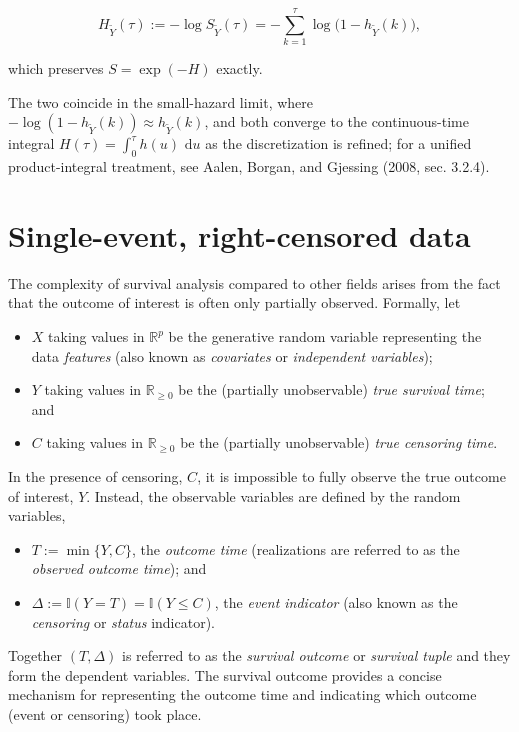 \documentclass[
  letterpaper,
  krantz2]{style/krantz}
\providecommand{\tightlist}{%
  \setlength{\itemsep}{0pt}\setlength{\parskip}{0pt}}
\begin{document}
\[
H_{\tilde{Y}}(\tau) := -\log S_{\tilde{Y}}(\tau) = -\sum_{k=1}^{\tau}\log\bigl(1 - h_{\tilde{Y}}(k)\bigr),
\]

which preserves \(S = \exp(-H)\) exactly.

The two coincide in the small-hazard limit, where
\(-\log(1 - h_{\tilde{Y}}(k)) \approx h_{\tilde{Y}}(k)\), and both
converge to the continuous-time integral
\(H(\tau) = \int_0^\tau h(u)\,\,\mathrm{d}u\) as the discretization is
refined; for a unified product-integral treatment, see Aalen, Borgan,
and Gjessing (2008, sec. 3.2.4).

\section{Single-event, right-censored data}\label{sec-data-rc}

The complexity of survival analysis compared to other fields arises from
the fact that the outcome of interest is often only partially observed.
Formally, let

\begin{itemize}
\tightlist
\item
  \(X\) taking values in \(\mathbb{R}^p\) be the generative random
  variable representing the data \emph{features} (also known as
  \emph{covariates} or \emph{independent variables});
\item
  \(Y\) taking values in \(\mathbb{R}_{\geq 0}\) be the (partially
  unobservable) \emph{true survival time}; and
\item
  \(C\) taking values in \(\mathbb{R}_{\geq 0}\) be the (partially
  unobservable) \emph{true censoring time}.
\end{itemize}

In the presence of censoring, \(C\), it is impossible
to fully observe the true outcome of interest, \(Y\). Instead, the
observable variables are defined by the random variables,

\begin{itemize}
\tightlist
\item
  \(T := \min\{Y,C\}\), the \emph{outcome time} (realizations are
  referred to as the \emph{observed outcome time}); and
\item
  \(\Delta := \mathbb{I}(Y = T) = \mathbb{I}(Y \leq C)\), the
  \emph{event indicator} (also known as the
  \emph{censoring} or \emph{status} indicator).
\end{itemize}

Together \((T,\Delta)\) is referred to as the \emph{survival outcome} or
\emph{survival tuple} and they form the
dependent variables. The survival outcome provides a concise mechanism
for representing the outcome time and indicating which outcome (event or
censoring) took place.
\end{document}
